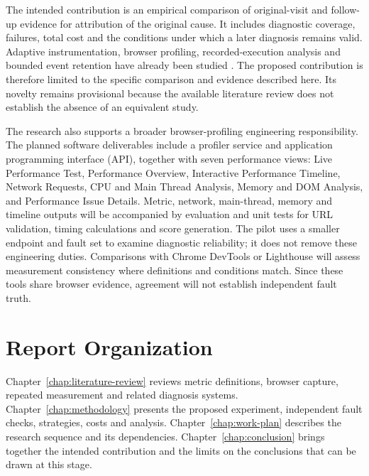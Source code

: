 The intended contribution is an empirical comparison of original-visit and follow-up evidence for attribution of the original cause. It includes diagnostic coverage, failures, total cost and the conditions under which a later diagnosis remains valid. Adaptive instrumentation, browser profiling, recorded-execution analysis and bounded event retention have already been studied \parencite{TIIDVPV8,HS3PKWFL,ZZSL9IPU,3ED3FDXH}. The proposed contribution is therefore limited to the specific comparison and evidence described here. Its novelty remains provisional because the available literature review does not establish the absence of an equivalent study.

The research also supports a broader browser-profiling engineering responsibility. The planned software deliverables include a profiler service and application programming interface (API), together with seven performance views: Live Performance Test, Performance Overview, Interactive Performance Timeline, Network Requests, CPU and Main Thread Analysis, Memory and DOM Analysis, and Performance Issue Details. Metric, network, main-thread, memory and timeline outputs will be accompanied by evaluation and unit tests for URL validation, timing calculations and score generation. The pilot uses a smaller endpoint and fault set to examine diagnostic reliability; it does not remove these engineering duties. Comparisons with Chrome DevTools or Lighthouse will assess measurement consistency where definitions and conditions match. Since these tools share browser evidence, agreement will not establish independent fault truth.

\section{Report Organization}

Chapter~\ref{chap:literature-review} reviews metric definitions, browser capture, repeated measurement and related diagnosis systems. Chapter~\ref{chap:methodology} presents the proposed experiment, independent fault checks, strategies, costs and analysis. Chapter~\ref{chap:work-plan} describes the research sequence and its dependencies. Chapter~\ref{chap:conclusion} brings together the intended contribution and the limits on the conclusions that can be drawn at this stage.
